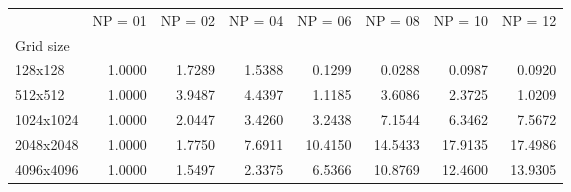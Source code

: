 \begin{tabular}{lrrrrrrr}
\toprule
{} &  NP = 01 &  NP = 02 &  NP = 04 &  NP = 06 &  NP = 08 &  NP = 10 &  NP = 12 \\
Grid size &          &          &          &          &          &          &          \\
\midrule
128x128   &   1.0000 &   1.7289 &   1.5388 &   0.1299 &   0.0288 &   0.0987 &   0.0920 \\
512x512   &   1.0000 &   3.9487 &   4.4397 &   1.1185 &   3.6086 &   2.3725 &   1.0209 \\
1024x1024 &   1.0000 &   2.0447 &   3.4260 &   3.2438 &   7.1544 &   6.3462 &   7.5672 \\
2048x2048 &   1.0000 &   1.7750 &   7.6911 &  10.4150 &  14.5433 &  17.9135 &  17.4986 \\
4096x4096 &   1.0000 &   1.5497 &   2.3375 &   6.5366 &  10.8769 &  12.4600 &  13.9305 \\
\bottomrule
\end{tabular}
